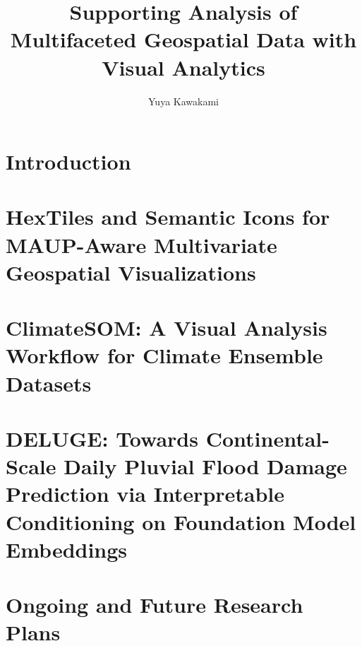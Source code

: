 \documentclass[12pt]{ucdavisthesis}
\title          {Supporting Analysis of Multifaceted Geospatial Data with Visual Analytics}
\author         {Yuya Kawakami}
\begin{document}

% 

\makeintropages
\chapter{Introduction}

\chapter{HexTiles and Semantic Icons for MAUP-Aware Multivariate Geospatial Visualizations}\label{chp:hextiles}

\chapter{ClimateSOM: A Visual Analysis Workflow for Climate Ensemble Datasets}\label{chp:climatesom}

\chapter{DELUGE: Towards Continental-Scale Daily Pluvial Flood Damage Prediction via Interpretable Conditioning on Foundation Model Embeddings}\label{chp:deluge}

\chapter{Ongoing and Future Research Plans}\label{chp:future}





\end{document}
